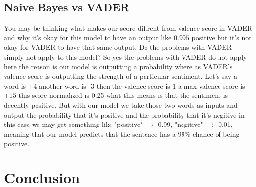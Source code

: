 \documentclass[12pt]{article}
\begin{document}
\subsection{Naive Bayes vs VADER}
You may be thinking what makes our score diffrent from valence score in VADER and why it's okay for this model to have
an output like $0.995$ positive but it's not okay for VADER to have that same output. Do the problems with VADER simply
not apply to this model? So yes the problems with VADER do not apply here the reason is our model is outputting a probability
where as VADER's valence score is outputting the strength of a particular sentiment. Let's say a word is +4 another word is -3
then the valence score is 1 a max valence score is $\pm15$ this score normalized is 0.25 what this means is that the sentiment 
is decently positive. But with our model we take those two words as inputs and output the probability that it's positive and the
probability that it's negitive in this case we may get something like "positive" $\rightarrow$ 0.99, "negitive" $\rightarrow$ 0.01, meaning that our
model predicts that the sentence has a 99\% chance of being positive.

\section{Conclusion}

\newpage
{}

\end{document}
